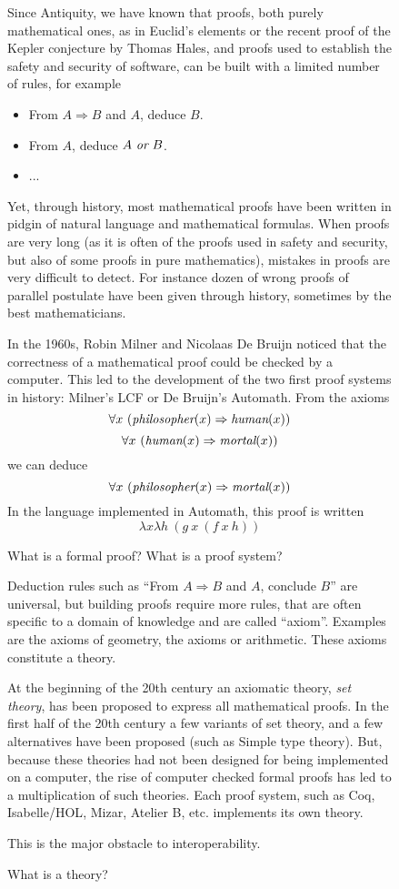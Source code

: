 \begin{figure}
\begin{framed}
Since Antiquity, we have known that
proofs, both purely mathematical ones, as in Euclid's elements or the
recent proof of the Kepler conjecture by Thomas Hales, and proofs used
to establish the safety and security of software, can be built with a
limited number of rules, for example
\begin{itemize}
\item From $A \Rightarrow B$ and $A$, deduce $B$.
\item From $A$, deduce $A~\mbox{\it or}~B$.
\item ...
\end{itemize}
Yet, through history, most mathematical proofs have been written in
pidgin of natural language and mathematical formulas. When proofs are
very long (as it is often of the proofs used in safety and security,
but also of some proofs in pure mathematics), mistakes in proofs are
very difficult to detect. For instance dozen of wrong proofs of
parallel postulate have been given through history, sometimes by the
best mathematicians.

In the 1960s, Robin Milner and Nicolaas De Bruijn noticed that the
correctness of a mathematical proof could be checked by a
computer. This led to the development of the two first proof systems
in history: Milner's {\textsf LCF} or De Bruijn's {\textsf Automath}.  From
the axioms
$$\forall x~(\mbox{\em philosopher}(x) \Rightarrow \mbox{\em human}(x))$$
$$\forall x~(\mbox{\em human}(x) \Rightarrow \mbox{\em mortal}(x))$$
we can deduce
$$\forall x~(\mbox{\em philosopher}(x) \Rightarrow \mbox{\em mortal}(x))$$
In the language implemented in {\textsf Automath}, this proof is written
$$\lambda x \lambda h~(g~x~(f~x~h))$$

\caption{What is a formal proof? What is a proof system?\label{formal}}
\end{framed}
\end{figure}

\begin{figure}
\begin{framed}
Deduction rules such as ``From $A \Rightarrow B$ and $A$, conclude
$B$'' are universal, but building proofs require more rules, that are
often specific to a domain of knowledge and are called
``axiom''. Examples are the axioms of geometry, the axioms or
arithmetic. These axioms constitute a theory.

At the beginning of the 20th century an axiomatic theory, {\em set
  theory}, has been proposed to express all mathematical proofs. In
the first half of the 20th century a few variants of set theory, and a
few alternatives have been proposed (such as Simple type theory).
But, because these theories had not been designed for being
implemented on a computer, the rise of computer checked formal proofs
has led to a multiplication of such theories. Each proof system,
such as {\textsf Coq}, {\textsf Isabelle/HOL}, {\textsf Mizar}, {\textsf Atelier B},
etc. implements its own theory.

This is the major obstacle to interoperability.
\caption{What is a theory?\label{theory}}
\end{framed}
\end{figure}

